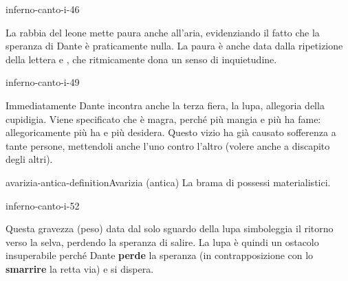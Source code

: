 \documentclass[preview]{standalone}
\begin{document}
\begin{snippet}{inferno-canto-i-46}

    La rabbia del leone mette paura anche all'aria, evidenziando il fatto che
    la speranza di Dante è praticamente nulla. La paura è anche data dalla ripetizione
    della lettera  e , che ritmicamente dona un senso di inquietudine.
\end{snippet}

\begin{snippet}{inferno-canto-i-49}

  Immediatamente Dante incontra anche la terza fiera, la lupa, allegoria della cupidigia. Viene 
  specificato che è magra, perché più mangia e più ha fame: allegoricamente più ha e più desidera. 
  Questo vizio ha già causato sofferenza a tante persone, mettendoli anche l'uno contro l'altro (volere anche a discapito degli altri).
\end{snippet}

\begin{snippetdefinition}{avarizia-antica-definition}{Avarizia (antica)}
    La brama di possessi materialistici.
\end{snippetdefinition}

\begin{snippet}{inferno-canto-i-52}

    Questa gravezza (peso) data dal solo sguardo della lupa simboleggia il ritorno verso la selva, perdendo la speranza di salire.
    La lupa è quindi un ostacolo insuperabile perché Dante \textbf{perde} la speranza (in contrapposizione
    con lo \textbf{smarrire} la retta via) e si dispera.
\end{snippet}
\end{document}
